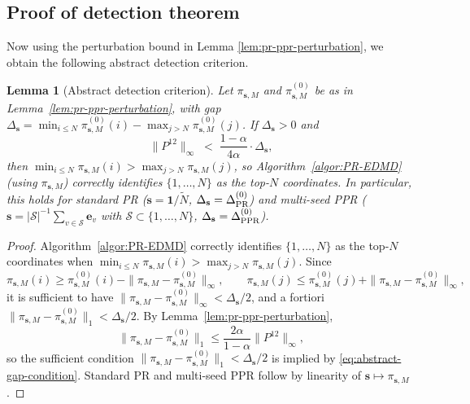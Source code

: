 \documentclass{article}
\theoremstyle{plain}
\newtheorem{lemma}[theorem]{Lemma}
\theoremstyle{definition}
\newcommand{\norm}[1]{\| #1 \|}
\begin{document}
\subsection{Proof of detection theorem}\label{sec:proofs-detection}

Now using the perturbation bound in Lemma \ref{lem:pr-ppr-perturbation}, we obtain the following abstract detection criterion. 

\begin{lemma}[Abstract detection criterion]\label{lem:abstract-detection}
	Let ${\pi}_{\mathbf{s}, M}$ and ${\pi}_{\mathbf{s}, M}^{(0)}$ be as in Lemma~\ref{lem:pr-ppr-perturbation}, with gap $\Delta_{\mathbf{s}} = \min_{i \leq N}\pi_{\mathbf{s}, M}^{(0)}(i) - \max_{j > N}\pi_{\mathbf{s}, M}^{(0)}(j)$. If $\Delta_{\mathbf{s}} > 0$ and
	\begin{equation}\label{eq:abstract-gap-condition}
		\|P^{12}\|_\infty \;<\; \frac{1-\alpha}{4\alpha}\cdot \Delta_{\mathbf{s}},
	\end{equation}
	then $\min_{i \leq N}\pi_{\mathbf{s}, M}(i) > \max_{j > N}\pi_{\mathbf{s}, M}(j)$, so Algorithm~\ref{algor:PR-EDMD} (using ${\pi}_{\mathbf{s}, M}$) correctly identifies $\{1,\ldots,N\}$ as the top-$N$ coordinates. In particular, this holds for standard PR ($\mathbf{s} = \mathbf{1}/\tilde{N}$, $\Delta_{\mathbf{s}} = \Delta^{(0)}_{\textnormal{PR}}$) and multi-seed PPR ($\mathbf{s} = |\mathcal{S}|^{-1}\sum_{v \in \mathcal{S}}\mathbf{e}_v$ with $\mathcal{S} \subset \{1,\ldots,N\}$, $\Delta_{\mathbf{s}} = \Delta^{(0)}_{\textnormal{PPR}}$).
\end{lemma}

\begin{proof}%
	Algorithm~\ref{algor:PR-EDMD} correctly identifies $\{1,\ldots,N\}$ as the top-$N$ coordinates when $\min_{i\leq N}\pi_{\mathbf{s},M}(i) > \max_{j>N}\pi_{\mathbf{s},M}(j)$. Since
	\begin{equation*}
		\pi_{\mathbf{s},M}(i) \geq \pi_{\mathbf{s},M}^{(0)}(i) - \norm{{\pi}_{\mathbf{s},M} - {\pi}_{\mathbf{s},M}^{(0)}}_\infty, \qquad \pi_{\mathbf{s},M}(j) \leq \pi_{\mathbf{s},M}^{(0)}(j) + \norm{{\pi}_{\mathbf{s},M} - {\pi}_{\mathbf{s},M}^{(0)}}_\infty,
	\end{equation*}
	it is sufficient to have $\norm{{\pi}_{\mathbf{s},M} - {\pi}_{\mathbf{s},M}^{(0)}}_\infty < \Delta_{\mathbf{s}}/2$, and a fortiori $\norm{{\pi}_{\mathbf{s},M} - {\pi}_{\mathbf{s},M}^{(0)}}_1 < \Delta_{\mathbf{s}}/2$. By Lemma~\ref{lem:pr-ppr-perturbation},
	\begin{equation*}
		\norm{{\pi}_{\mathbf{s},M} - {\pi}_{\mathbf{s},M}^{(0)}}_1 \leq \frac{2\alpha}{1-\alpha}\norm{P^{12}}_\infty,
	\end{equation*}
	so the sufficient condition $\norm{{\pi}_{\mathbf{s},M} - {\pi}_{\mathbf{s},M}^{(0)}}_1 < \Delta_{\mathbf{s}}/2$ is implied by \eqref{eq:abstract-gap-condition}. Standard PR and multi-seed PPR follow by linearity of $\mathbf{s}\mapsto{\pi}_{\mathbf{s},M}$. \qedhere
\end{proof}
\end{document}
